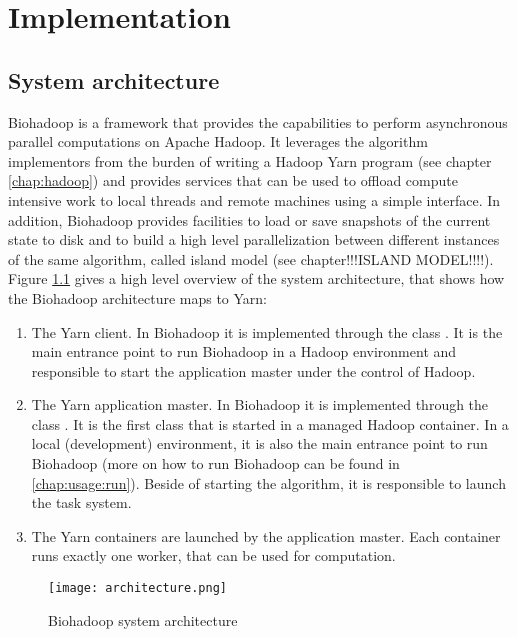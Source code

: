 \chapter{Implementation}
\label{chap:impl}

\section{System architecture}
\label{chap:impl:system-architecture}
  Biohadoop is a framework that provides the capabilities to perform asynchronous parallel computations on Apache Hadoop. It leverages the algorithm implementors from the burden of writing a Hadoop Yarn program (see chapter \ref{chap:hadoop}) and provides services that can be used to offload compute intensive work to local threads and remote machines using a simple interface. In addition, Biohadoop provides facilities to load or save snapshots of the current state to disk and to build a high level parallelization between different instances of the same algorithm, called island model (see chapter!!!ISLAND MODEL!!!!). Figure \ref{fig:architecture} gives a high level overview of the system architecture, that shows how the Biohadoop architecture maps to Yarn:
  
  \begin{enumerate}
    \item The Yarn client. In Biohadoop it is implemented through the class . It is the main entrance point to run Biohadoop in a Hadoop environment and responsible to start the application master under the control of Hadoop.
    \item The Yarn application master. In Biohadoop it is implemented through the class . It is the first class that is started in a managed Hadoop container. In a local (development) environment, it is also the main entrance point to run Biohadoop (more on how to run Biohadoop can be found in \ref{chap:usage:run}). Beside of starting the algorithm, it is responsible to launch the task system.
    \item The Yarn containers are launched by the application master. Each container runs exactly one worker, that can be used for computation.
  \end{enumerate}
  
  \begin{figure}[ht!]
    \centering
    \texttt{[image: architecture.png]}
    \caption{Biohadoop system architecture}
    \label{fig:architecture}
  \end{figure}
  
